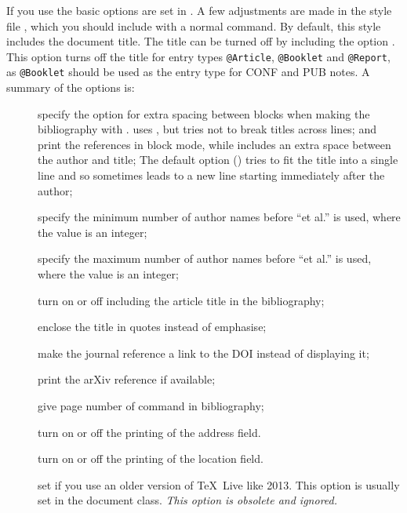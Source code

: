 \documentclass[REPORT=false, UKenglish]{atlasdoc}
\begin{document}
If you use  the basic options are set in .
A few adjustments are made in the style file ,
which you should include with a normal  command.
By default, this style includes the document title.
The title can be turned off by including the option .
This option turns off the title for entry types \texttt{@Article}, \texttt{@Booklet} and \texttt{@Report},
as \texttt{@Booklet} should be used as the entry type for CONF and PUB notes.
A summary of the options is:
\begin{description}
\item[] specify the option for extra spacing between blocks when making the bibliography with .
   uses , but tries not to break titles across lines;
   and  print the references in block mode, while  includes an extra space between the author and title;
  The default option () tries to fit the title into a single line
  and so sometimes leads to a new line starting immediately after the author;
\item[] specify the minimum number of author names before \enquote{et al.} is used, where the value is an integer;
\item[] specify the maximum number of author names before \enquote{et al.} is used, where the value is an integer;
\item[] turn on or off including the article title in the bibliography;
\item[] enclose the title in quotes instead of emphasise;
\item[] make the journal reference a link to the DOI instead of displaying it;
\item[] print the arXiv reference if available;
\item[] give page number of  command in bibliography;
\item[] turn on or off the printing of the address field.
\item[] turn on or off the printing of the location field.
\item[] set if you use an older version of \TeX\ Live like 2013.
  This option is usually set in the document class.
  \emph{ This option is obsolete and ignored.}
\end{description}
\end{document}
